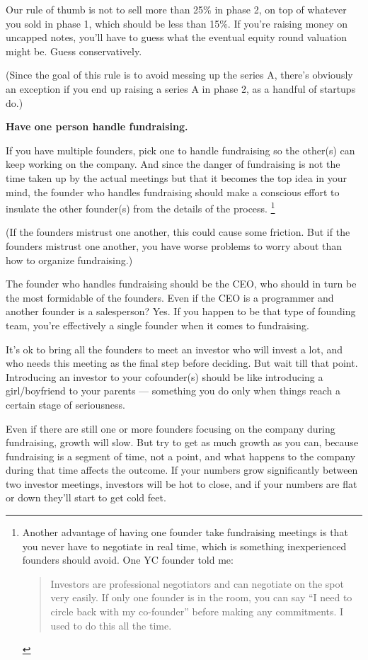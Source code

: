 Our rule of thumb is not to sell more than 25\% in phase 2, on top of
whatever you sold in phase 1, which should be less than 15\%. If you're
raising money on uncapped notes, you'll have to guess what the eventual
equity round valuation might be. Guess conservatively.

(Since the goal of this rule is to avoid messing up the series A,
there's obviously an exception if you end up raising a series A in phase
2, as a handful of startups do.)

\textbf{Have one person handle fundraising.}

If you have multiple founders, pick one to handle fundraising so the
other(s) can keep working on the company. And since the danger of
fundraising is not the time taken up by the actual meetings but that it
becomes the top idea in your mind, the founder who handles fundraising
should make a conscious effort to insulate the other founder(s) from the
details of the process. \footnote{Another advantage of having one founder take fundraising
meetings is that you never have to negotiate in real time, which is
something inexperienced founders should avoid. One YC founder told me:

\begin{quote}
Investors are professional negotiators and can negotiate on the spot
very easily. If only one founder is in the room, you can say ``I need to
circle back with my co-founder'' before making any commitments. I used
to do this all the time.
\end{quote}}

(If the founders mistrust one another, this could cause some friction.
But if the founders mistrust one another, you have worse problems to
worry about than how to organize fundraising.)

The founder who handles fundraising should be the CEO, who should in
turn be the most formidable of the founders. Even if the CEO is a
programmer and another founder is a salesperson? Yes. If you happen to
be that type of founding team, you're effectively a single founder when
it comes to fundraising.

It's ok to bring all the founders to meet an investor who will invest a
lot, and who needs this meeting as the final step before deciding. But
wait till that point. Introducing an investor to your cofounder(s)
should be like introducing a girl/boyfriend to your parents ---
something you do only when things reach a certain stage of seriousness.

Even if there are still one or more founders focusing on the company
during fundraising, growth will slow. But try to get as much growth as
you can, because fundraising is a segment of time, not a point, and what
happens to the company during that time affects the outcome. If your
numbers grow significantly between two investor meetings, investors will
be hot to close, and if your numbers are flat or down they'll start to
get cold feet.

